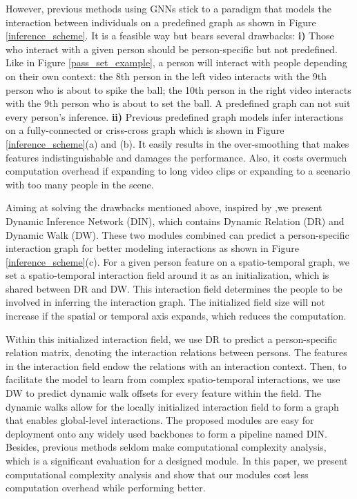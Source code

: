 \documentclass[10pt,twocolumn,letterpaper]{article}
\begin{document}
However, previous methods using GNNs stick to a paradigm that models the interaction between individuals on a predefined graph as shown in Figure \ref{inference_scheme}. It is a feasible way but bears several drawbacks: \textbf{i)} Those who interact with a given person should be person-specific but not predefined. Like in Figure \ref{pass_set_example}, a person will interact with people depending on their own context: the 8th person in the left video interacts with the 9th person who is about to spike the ball; the 10th person in the right video interacts with the 9th person who is about to set the ball. A predefined graph can not suit every person's inference. \textbf{ii)} Previous predefined graph models infer interactions on a fully-connected \cite{wu2019learning} or criss-cross \cite{yan2020higcin,pramono2020eccvempowering} graph which is shown in Figure \ref{inference_scheme}(a) and (b). It easily results in the over-smoothing \cite{deeper_insignt_intoGCN} that makes features indistinguishable and damages the performance. Also, it costs overmuch computation overhead if expanding to long video clips or expanding to a scenario with too many people in the scene.











Aiming at solving the drawbacks mentioned above, inspired by \cite{dai2017dcnv1,zhang2020DGMN},we present Dynamic Inference Network (DIN), which contains Dynamic Relation (DR) and Dynamic Walk (DW). These two modules combined can predict a person-specific interaction graph for better modeling interactions as shown in Figure \ref{inference_scheme}(c). For a given person feature on a spatio-temporal graph, we set a spatio-temporal interaction field around it as an initialization, which is shared between DR and DW. This interaction field determines the people to be involved in inferring the interaction graph. The initialized field size will not increase if the spatial or temporal axis expands, which reduces the computation.


Within this initialized interaction field, we use DR to predict a person-specific relation matrix, denoting the interaction relations between persons. The features in the interaction field endow the relations with an interaction context. Then, to facilitate the model to learn from complex spatio-temporal interactions, we use DW to predict dynamic walk offsets for every feature within the field. The dynamic walks allow for the locally initialized interaction field to form a graph that enables global-level interactions. The proposed modules are easy for deployment onto any widely used backbones to form a pipeline named DIN. Besides, previous methods seldom make computational complexity analysis, which is a significant evaluation for a designed module. In this paper, we present computational complexity analysis and show that our modules cost less computation overhead while performing better.
\end{document}
